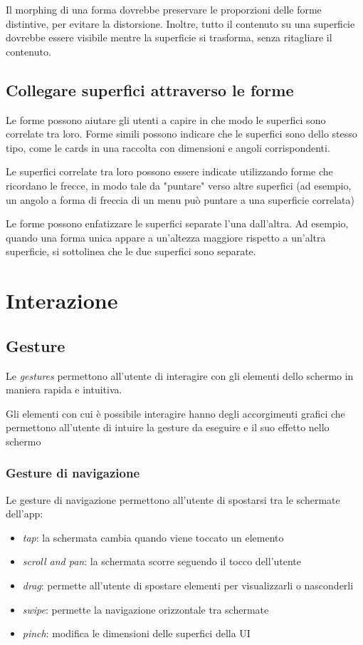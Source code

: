 \documentclass[12pt, a4paper]{report}
\begin{document}
	Il morphing di una forma dovrebbe preservare le proporzioni delle forme distintive, per evitare la distorsione.
	Inoltre, tutto il contenuto su una superficie dovrebbe essere visibile mentre la superficie si trasforma, senza ritagliare il contenuto.

	\subsection{Collegare superfici attraverso le forme}
	Le forme possono aiutare gli utenti a capire in che modo le superfici sono correlate tra loro.
	Forme simili possono indicare che le superfici sono dello stesso tipo, come le cards in una raccolta con dimensioni e angoli corrispondenti.

	Le superfici correlate tra loro possono essere indicate utilizzando forme che ricordano le frecce, in modo tale da "puntare" verso altre superfici (ad esempio, un angolo a forma di freccia di un menu può puntare a una superficie correlata)

	Le forme possono enfatizzare le superfici separate l'una dall'altra. Ad esempio, quando una forma unica appare a un'altezza maggiore rispetto a un'altra superficie, si sottolinea che le due superfici sono separate.
	
	
	\section{Interazione}

		\subsection{Gesture}	
		Le \textit{gestures} permettono all'utente di interagire con gli elementi dello schermo in maniera rapida e intuitiva.
		
		Gli elementi con cui è possibile interagire hanno degli accorgimenti grafici che permettono all'utente di intuire la gesture da eseguire e il suo effetto nello schermo
		
			\subsubsection{Gesture di navigazione}
			Le gesture di navigazione permettono all'utente di spostarsi tra le schermate dell'app:
			\begin{itemize}
				\item \textit{tap}: la schermata cambia quando viene toccato un elemento
				\item \textit{scroll and pan}: la schermata scorre seguendo il tocco dell'utente
				\item \textit{drag}: permette all'utente di spostare elementi per visualizzarli o nasconderli
				\item \textit{swipe}: permette la navigazione orizzontale tra schermate
				\item \textit{pinch}: modifica le dimensioni delle superfici della UI
			\end{itemize}
			
\end{document}
